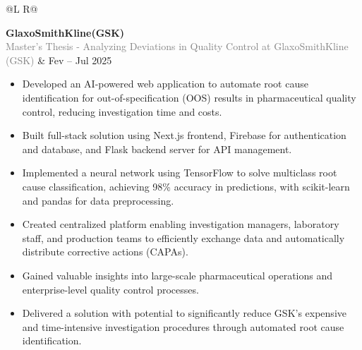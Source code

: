 \documentclass[a4paper,portrait]{article}
\newcommand{\lighttext}[1]{\textcolor{gray}{#1}}
\begin{document}
\begin{tabularx}{\textwidth}{@{}L R@{}}
  \toprule

  \textbf{GlaxoSmithKline(GSK)}\\
  \lighttext{Master's Thesis - Analyzing Deviations in Quality Control at GlaxoSmithKline (GSK)} & Fev -- Jul 2025\\[0.2cm]

  \begin{minipage}[t]{\linewidth}
    \begin{itemize}[noitemsep,topsep=0pt,parsep=0pt,partopsep=0pt]
      \item Developed an AI-powered web application to automate root cause identification for out-of-specification (OOS) results in pharmaceutical quality control, reducing investigation time and costs.

      \item Built full-stack solution using Next.js frontend, Firebase for authentication and database, and Flask backend server for API management.

      \item Implemented a neural network using TensorFlow to solve multiclass root cause classification, achieving 98\% accuracy in predictions, with scikit-learn and pandas for data preprocessing.

      \item Created centralized platform enabling investigation managers, laboratory staff, and production teams to efficiently exchange data and automatically distribute corrective actions (CAPAs).

      \item Gained valuable insights into large-scale pharmaceutical operations and enterprise-level quality control processes.

      \item Delivered a solution with potential to significantly reduce GSK's expensive and time-intensive investigation procedures through automated root cause identification.

    \end{itemize}
  \end{minipage}\\\\
\end{tabularx}
\end{document}
